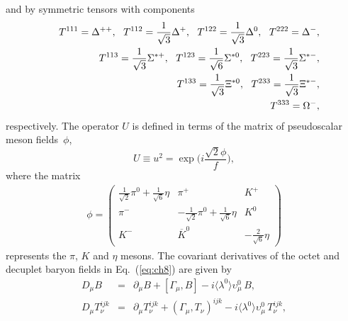 \documentclass[preprintnumbers,prd,superscriptaddress,preprint]{revtex4-1}
\begin{document}
%
and by symmetric tensors with components
%
\begin{eqnarray}
\label{e.T}
&&T^{111} = \Delta^{++},\ \
T^{112} = \frac{1}{\sqrt 3} \Delta^+,\ \
T^{122} = \frac{1}{\sqrt 3} \Delta^0,\ \
T^{222} = \Delta^-,				\notag\\
%
&&T^{113} = \frac{1}{\sqrt 3} \Sigma^{*+},\ \
T^{123} = \frac{1}{\sqrt 6} \Sigma^{*0},\ \
T^{223} = \frac{1}{\sqrt 3} \Sigma^{*-},	\\
%
&&T^{133} = \frac{1}{\sqrt 3} \Xi^{*0},\ \
T^{233} = \frac{1}{\sqrt 3} \Xi^{*-},		\notag\\
%
&&T^{333} = \Omega^-,           \notag
%
%
%
%
\end{eqnarray}
%
respectively.
%
The operator $U$ is defined in terms of the matrix of pseudoscalar meson fields~$\phi$,
%
\begin{equation}
U \equiv u^2 = \exp\bigg(i \frac{\sqrt2\phi}{f}\bigg),
\end{equation}
%
where the matrix
%
\begin{eqnarray}
\label{e.phi}
\phi =
\left(
{\begin{array}{*{20}{c}}
  \frac{1}{\sqrt 2} \pi^0 + \frac{1}{\sqrt 6} \eta
& \pi^+
& K^+						\\
  \pi^-
& -\frac{1}{\sqrt 2} \pi^0 + \frac{1}{\sqrt 6} \eta
& K^0						\\
  K^-
& \overline K^0
& -\frac{2}{\sqrt 6} \eta
\end{array}}
\right)
\end{eqnarray}
%
represents the $\pi$, $K$ and $\eta$ mesons.
%
The covariant derivatives of the octet and decuplet baryon fields in Eq.~(\ref{eq:ch8}) are given by~\cite{Hemmert:1998pi, Hemmert:1999mr}
%
\begin{eqnarray}
D_\mu B
&=& \partial_\mu B
 + [\Gamma_\mu, B]
 - i \langle \lambda^0 \rangle \upsilon_\mu^0\, B,	\\
%
D_\mu T_\nu^{ijk}
&=& \partial_\mu T_\nu^{ijk}
 + (\Gamma_\mu, T_\nu )^{ijk}
 - i \langle \lambda^0 \rangle \upsilon_\mu^0\, T_\nu^{ijk},
\label{eq:11}
\end{eqnarray}
\end{document}
